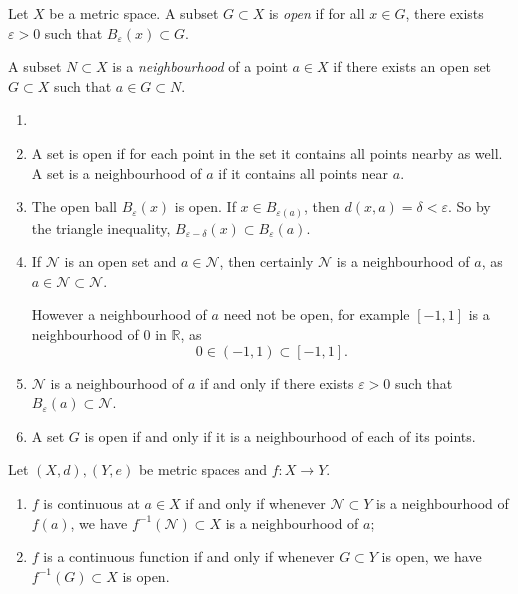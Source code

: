 \documentclass[12pt]{article}
\begin{document}
\begin{definition}
	Let $X$ be a metric space. A subset $G \subset X$ is \textit{open} if for all $x \in G$, there exists $\varepsilon > 0$ such that $B_{\varepsilon}(x) \subset G$.

	A subset $N \subset X$ is a \textit{neighbourhood} of a point $a \in X$ if there exists an open set $G \subset X$ such that $a \in G \subset N$.
\end{definition}

\begin{remark}
	\begin{enumerate}[1.]
		\item[]
		\item A set is open if for each point in the set it contains all points nearby as well. A set is a neighbourhood of $a$ if it contains all points near $a$.
		\item The open ball $B_{\varepsilon}(x)$ is open. If $x \in B_{\varepsilon(a)}$, then $d(x, a) = \delta < \varepsilon$. So by the triangle inequality, $B_{\varepsilon - \delta}(x) \subset B_{\varepsilon}(a)$.
		\item If $\mathcal{N}$ is an open set and $a \in \mathcal{N}$, then certainly $\mathcal{N}$ is a neighbourhood of $a$, as $a \in \mathcal{N} \subset \mathcal{N}$.

			However a neighbourhood of $a$ need not be open, for example $[-1, 1]$ is a neighbourhood of $0$ in $\mathbb{R}$, as
			\[
				0 \in (-1, 1) \subset [-1, 1]
			.\]
		\item $\mathcal{N}$ is a neighbourhood of $a$ if and only if there exists $\varepsilon > 0$ such that $B_{\varepsilon}(a) \subset \mathcal{N}$.
		\item A set $G$ is open if and only if it is a neighbourhood of each of its points.
	\end{enumerate}
\end{remark}

\begin{proposition}
	Let $(X, d), (Y, e)$ be metric spaces and $f : X \to Y$.
	\begin{enumerate}[\normalfont(i)]
		\item $f$ is continuous at $a \in X$ if and only if whenever $\mathcal{N} \subset Y$ is a neighbourhood of $f(a)$, we have $f^{-1}(\mathcal{N}) \subset X$ is a neighbourhood of $a$;
		\item $f$ is a continuous function if and only if whenever $G \subset Y$ is open, we have $f^{-1}(G) \subset X$ is open.
	\end{enumerate}
\end{proposition}
\end{document}
